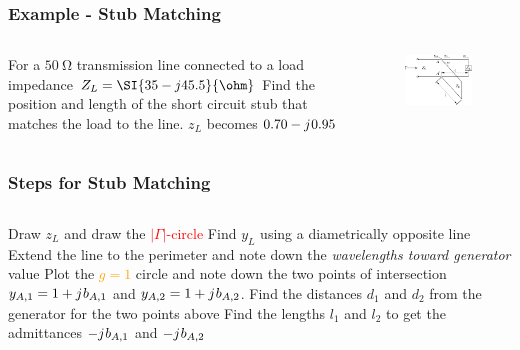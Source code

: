 \documentclass[10pt, compress]{beamer}
\renewcommand{\j}{{j}\mkern1mu} %
\begin{document}
\begin{frame}
    \frametitle{Example - Stub Matching}
    \begin{columns}[]
        \begin{column}[]{.5\textwidth}
            \begin{outline}
                \1 For a $\SI{50}{\ohm}$ transmission line connected to a load impedance $Z_L = \SI{35 - j 45.5}{\ohm}$
                \1 Find the position and length of the short circuit stub that matches the load to the line.
                \1 $z_L$ becomes $0.70 - \j 0.95$
            \end{outline}  
        \end{column}
        \begin{column}[]{.5\textwidth}
            \begin{figure}[]
                \centering
                \includegraphics[width=.9\textwidth]{tline_single_stub.pdf}
            \end{figure}
        \end{column}
    \end{columns}
\end{frame}

\begin{frame}
    \frametitle{Steps for Stub Matching}
    \begin{columns}[]
        \begin{column}[]{1\textwidth}
            \begin{outline}[enumerate]
                \1 Draw $z_L$ and draw the \textcolor{red}{$|\Gamma|$-circle}
                \1 Find $y_L$ using a diametrically  opposite line
                \1 Extend the line to the perimeter and note down the \textit{wavelengths toward generator} value
                \1 Plot the \textcolor{orange}{$g =1 $} circle and note down the two points of intersection $y_{A,1} = 1 + \j b_{A,1}$ and $y_{A,2} = 1 + \j b_{A,2}$.
                \1 Find the distances $d_1$ and $d_2$ from the generator for the two points above
                \1 Find the lengths $l_1$ and $l_2$ to get the admittances $ - \j b_{A,1}$ and $ - \j b_{A,2}$
            \end{outline}  
        \end{column}
    \end{columns}
\end{frame}
\end{document}
